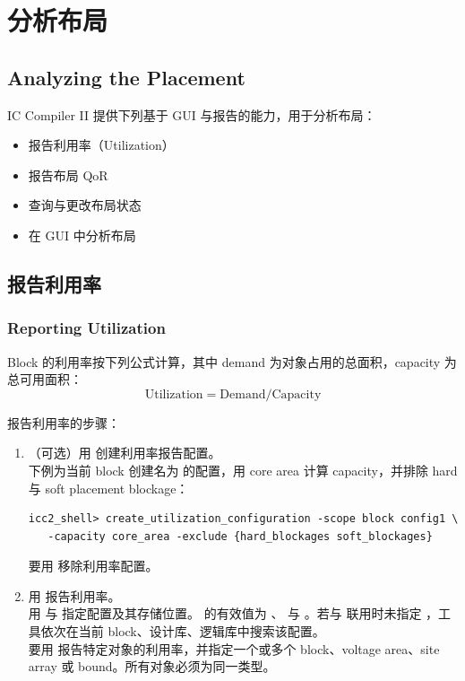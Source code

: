 \section{分析布局}
\subsection*{Analyzing the Placement}

IC Compiler II 提供下列基于 GUI 与报告的能力，用于分析布局：
\begin{itemize}
  \item 报告利用率（Utilization）
  \item 报告布局 QoR
  \item 查询与更改布局状态
  \item 在 GUI 中分析布局
\end{itemize}

\subsection{报告利用率}
\subsubsection*{Reporting Utilization}

Block 的利用率按下列公式计算，其中 demand 为对象占用的总面积，capacity 为总可用面积：
\[
\text{Utilization} = \text{Demand} / \text{Capacity}
\]

报告利用率的步骤：
\begin{enumerate}
  \item （可选）用  创建利用率报告配置。\\
        下例为当前 block 创建名为  的配置，用 core area 计算 capacity，并排除 hard 与 soft placement blockage：
\begin{lstlisting}
icc2_shell> create_utilization_configuration -scope block config1 \
   -capacity core_area -exclude {hard_blockages soft_blockages}
\end{lstlisting}
        要用  移除利用率配置。
  \item 用  报告利用率。\\
        用  与  指定配置及其存储位置。 的有效值为 、 与 。若与  联用时未指定 ，工具依次在当前 block、设计库、逻辑库中搜索该配置。\\
        要用 \opt{-of\_objects} 报告特定对象的利用率，并指定一个或多个 block、voltage area、site array 或 bound。所有对象必须为同一类型。
\end{enumerate}

